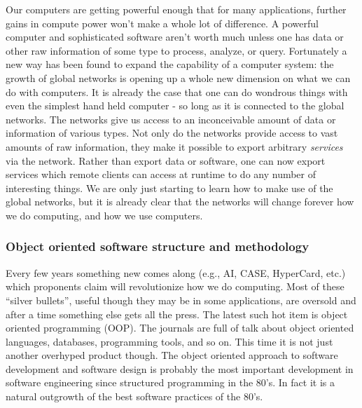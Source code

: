 Our computers are getting powerful enough that for many applications,
further gains in compute power won't make a whole lot of difference.  A
powerful computer and sophisticated software aren't worth much unless one
has data or other raw information of some type to process, analyze, or
query.  Fortunately a new way has been found to expand the capability of a
computer system:  the growth of global networks is opening up a whole new
dimension on what we can do with computers.  It is already the case that one
can do wondrous things with even the simplest hand held computer - so long
as it is connected to the global networks.  The networks give us access to
an inconceivable amount of data or information of various types.  Not only
do the networks provide access to vast amounts of raw information, they make
it possible to export arbitrary {\it services} via the network.  Rather than
export data or software, one can now export services which remote clients
can access at runtime to do any number of interesting things.  We are only
just starting to learn how to make use of the global networks, but it is
already clear that the networks will change forever how we do computing, and
how we use computers.

\subsubsection {Object oriented software structure and methodology}

Every few years something new comes along (e.g., AI, CASE, HyperCard, etc.)
which proponents claim will revolutionize how we do computing.  Most of
these ``silver bullets'', useful though they may be in some applications,
are oversold and after a time something else gets all the press.  The latest
such hot item is object oriented programming (OOP).  The journals are full
of talk about object oriented languages, databases, programming tools, and
so on.  This time it is not just another overhyped product though.  The
object oriented approach to software development and software design is
probably the most important development in software engineering since
structured programming in the 80's.  In fact it is a natural outgrowth of
the best software practices of the 80's.

